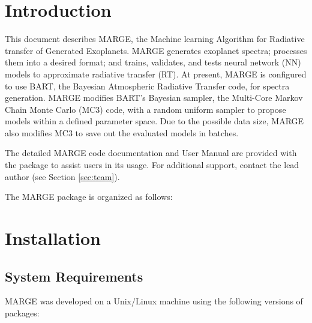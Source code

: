 \documentclass[letterpaper, 12pt]{article}
\begin{document}
\section{Introduction}
\label{sec:theory}

\noindent This document describes MARGE, the Machine learning Algorithm for Radiative 
transfer of Generated Exoplanets.  MARGE generates exoplanet spectra; processes 
them into a desired format; and trains, validates, and tests neural network (NN)
models to approximate radiative transfer (RT).  At present, MARGE is configured 
to use BART, the Bayesian Atmospheric Radiative Transfer code, for spectra 
generation.  MARGE modifies BART's Bayesian sampler, the Multi-Core Markov Chain
Monte Carlo (MC3) code, with a random uniform sampler to propose models within a
defined parameter space.  Due to the possible data size, MARGE also modifies MC3
to save out the evaluated models in batches.

\noindent The detailed MARGE code documentation and User Manual are provided with the 
package to assist users in its usage. For additional support, contact the lead 
author (see Section \ref{sec:team}).

\noindent The MARGE package is organized as follows: \newline
\noindent{}
\vspace{0.7cm}

\section{Installation}
\label{sec:installation}

\subsection{System Requirements}
\label{sec:requirements}

\noindent MARGE was developed on a Unix/Linux machine using the following 
versions of packages:
\end{document}
